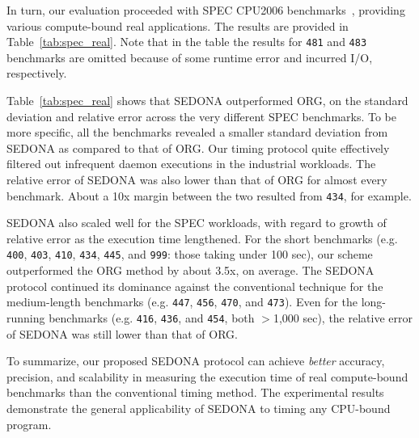 \documentclass[letter]{ieice}
\begin{document}
In turn, our evaluation proceeded with SPEC CPU2006 
benchmarks~\cite{specCpu2006}, providing various \linebreak 
\hbox{compute-bound} real applications. The results are \hbox{provided} in Table~\ref{tab:spec_real}. 
Note that in the table the results for {\tt 481} and {\tt 483} \hbox{benchmarks} 
are omitted because of some runtime error and incurred I/O, respectively.

{\color{blue}
Table~\ref{tab:spec_real} shows that 
SEDONA outperformed ORG,
on the standard deviation and relative error across the very different SPEC benchmarks. 
To be more specific, all the benchmarks revealed a smaller standard deviation 
from SEDONA as compared to that of ORG. 
Our timing protocol quite effectively filtered out infrequent daemon executions 
in the industrial workloads. The relative error of SEDONA was also 
lower than that of ORG for almost every benchmark.
{\color{blue}About a 10x \hbox{margin} between the two resulted from {\tt 434}, for example.}
}

SEDONA also scaled well for the SPEC workloads, 
with regard to growth of relative error as the execution time lengthened.
For the short benchmarks 
(e.g. {\tt 400}, {\tt 403}, {\tt 410}, 
{\tt 434}, {\tt 445}, and {\tt 999}: those taking \hbox{under} 100 sec), 
our scheme outperformed the ORG method by about 3.5x, on average. 
The SEDONA protocol continued its dominance against the conventional technique 
for the medium-length benchmarks (e.g. {\tt 447}, {\tt 456}, {\tt 470}, and {\tt 473}).
{\color{blue}Even for the long-running benchmarks (e.g. {\tt 416}, {\tt 436}, and {\tt 454}, both $>$1,000 sec), 
the relative error of \hbox{SEDONA} was still lower than that of ORG.}

To summarize, our proposed SEDONA protocol can achieve {\em better} accuracy,
precision, and scalability in measuring the execution time of real \hbox{compute-bound} benchmarks than the conventional timing method. 
{\color{blue}The experimental results demonstrate 
the general applicability of SEDONA to timing any CPU-bound program.}
\end{document}
